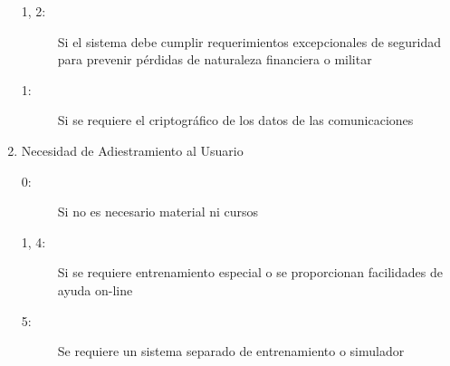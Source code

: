 \begin{enumerate}
\begin{description}
                   \item[1, 2:]Si el sistema debe cumplir requerimientos excepcionales de seguridad para prevenir pérdidas de naturaleza financiera o militar
                   \item[1:]Si se requiere el criptográfico de los datos de las comunicaciones
                 \end{description}
            \item Necesidad de Adiestramiento al Usuario
                \begin{description}
                   \item[0:]Si no es necesario material ni cursos
                   \item[1, 4:]Si se requiere entrenamiento especial o se proporcionan facilidades de ayuda on-line
                   \item[5:]Se requiere un sistema separado de entrenamiento o simulador
                \end{description}
    

\end{enumerate}
